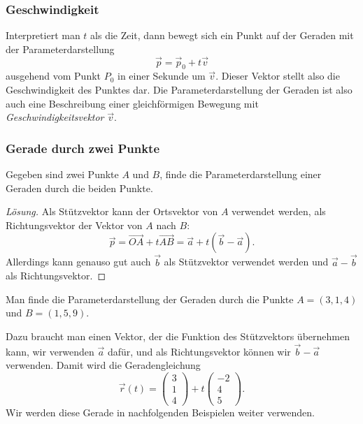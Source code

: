 \subsubsection{Geschwindigkeit}
Interpretiert man $t$ als die Zeit, dann bewegt sich ein Punkt auf der
Geraden mit der Parameterdarstellung
\[
\vec{p} = \vec{p}_0 + t \vec{v}
\]
ausgehend vom Punkt $P_0$ in einer Sekunde um $\vec v$.
Dieser Vektor stellt also die Geschwindigkeit des Punktes dar.
Die Parameterdarstellung der Geraden ist also auch eine
Beschreibung einer gleichförmigen Bewegung mit {\em Geschwindigkeitsvektor}
$\vec{v}$.

\subsubsection{Gerade durch zwei Punkte}
\begin{aufgabe}
Gegeben sind zwei Punkte $A$ und $B$, finde die Parameterdarstellung einer
Geraden durch die beiden Punkte.
\end{aufgabe}
\begin{proof}[Lösung]
Als Stützvektor kann der Ortsvektor von $A$ verwendet werden,
als Richtungsvektor der Vektor von $A$ nach $B$:
\[
\vec{p}
=
\overrightarrow{OA} + t\overrightarrow{AB}
=
\vec{a} + t(\vec{b}-\vec{a}).
\]
Allerdings kann genauso gut auch $\vec{b}$ als Stützvektor verwendet
werden und $\vec{a}-\vec{b}$ als Richtungsvektor.
\end{proof}

\begin{beispiel}
Man finde die Parameterdarstellung der Geraden durch die Punkte
$A=(3,1,4)$ und $B=(1,5,9)$.

\smallskip

{\parindent 0pt
Dazu} braucht man einen Vektor, der die Funktion des Stützvektors übernehmen
kann, wir verwenden $\vec{a}$ dafür, und als
Richtungsvektor können wir $\vec{b}-\vec{a}$ verwenden.
Damit wird die Geradengleichung
\begin{equation}
\vec r(t) =
\begin{pmatrix}3\\1\\4 \end{pmatrix}
+t
\begin{pmatrix}-2\\4\\5\end{pmatrix}.
\label{pigerade}
\end{equation}
Wir werden diese Gerade in nachfolgenden Beispielen weiter verwenden.
\end{beispiel}


